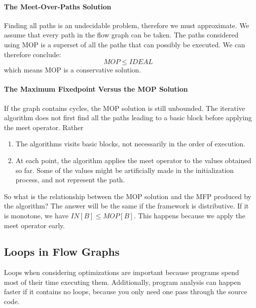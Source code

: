\documentclass{article}
\begin{document}
\paragraph{The Meet-Over-Paths Solution} %
\label{par:The Meet-Over-Paths Solution}
Finding all paths is an undecidable problem, therefore we must approximate. We assume that every path in the flow graph can be taken. The paths considered using MOP is a superset of all the paths that can possibly be executed. We can therefore conclude:
\begin{equation}
	MOP \le IDEAL
\end{equation}
which means MOP is a conservative solution.

\paragraph{The Maximum Fixedpoint Versus the MOP Solution} %
\label{par:The Maximum Fixedpoint Versus the MOP Solution}
If the graph contains cycles, the MOP solution is still unbounded. The iterative algorithm does not first find all the paths leading to a basic block before applying the meet operator. Rather
\begin{enumerate}
	\item The algorithms visits basic blocks, not necessarily in the order of execution.
	\item At each point, the algorithm applies the meet operator to the values obtained so far. Some of the values might be artificially made in the initialization process, and not represent the path.
\end{enumerate}
So what is the relationship between the MOP solution and the MFP produced by the algorithm? The answer will be the same if the framework is distributive. If it is monotone, we have $IN[B] \le MOP[B]$. This happens because we apply the meet operator early.

\subsection{Loops in Flow Graphs} %
\label{sub:Loops in Flow Graphs}
Loops when considering optimizations are important because programs spend most of their time executing them. Additionally, program analysis can happen faster if it contains no loops, because you only need one pass through the source code.
\end{document}
